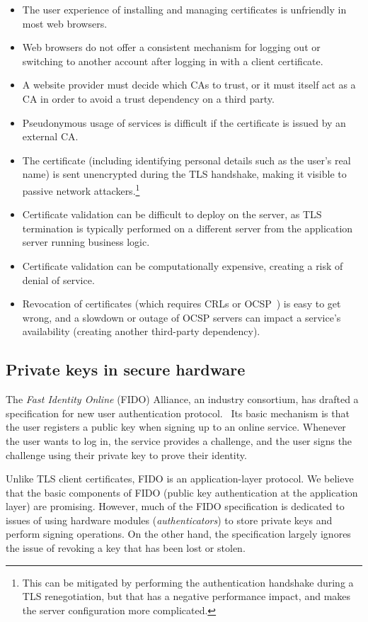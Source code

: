 \begin{itemize}
\item The user experience of installing and managing certificates is unfriendly in most web
browsers.
\item Web browsers do not offer a consistent mechanism for logging out or switching to another
account after logging in with a client certificate.
\item A website provider must decide which CAs to trust, or it must itself act as a CA in order to
avoid a trust dependency on a third party.
\item Pseudonymous usage of services is difficult if the certificate is issued by an external CA.
\item The certificate (including identifying personal details such as the user's real name) is sent
unencrypted during the TLS handshake, making it visible to passive network attackers.\footnote{This
can be mitigated by performing the authentication handshake during a TLS renegotiation, but that has
a negative performance impact, and makes the server configuration more complicated.}
\item Certificate validation can be difficult to deploy on the server, as TLS termination is
typically performed on a different server from the application server running business logic.
\item Certificate validation can be computationally expensive, creating a risk of denial of
service.~\cite{Parsovs14}
\item Revocation of certificates (which requires CRLs or OCSP~\cite{OCSP}) is easy to get wrong, and
a slowdown or outage of OCSP servers can impact a service's availability (creating another
third-party dependency).
\end{itemize}

\subsection{Private keys in secure hardware}

The \emph{Fast Identity Online} (FIDO) Alliance, an industry consortium, has drafted a specification
for new user authentication protocol.~\cite{FIDOOverview, FIDOSpec} Its basic mechanism is that the
user registers a public key when signing up to an online service. Whenever the user wants to log in,
the service provides a challenge, and the user signs the challenge using their private key to prove
their identity.

Unlike TLS client certificates, FIDO is an application-layer protocol. We believe that the basic
components of FIDO (public key authentication at the application layer) are promising. However, much
of the FIDO specification is dedicated to issues of using hardware modules (\emph{authenticators})
to store private keys and perform signing operations. On the other hand, the specification largely
ignores the issue of revoking a key that has been lost or stolen.


